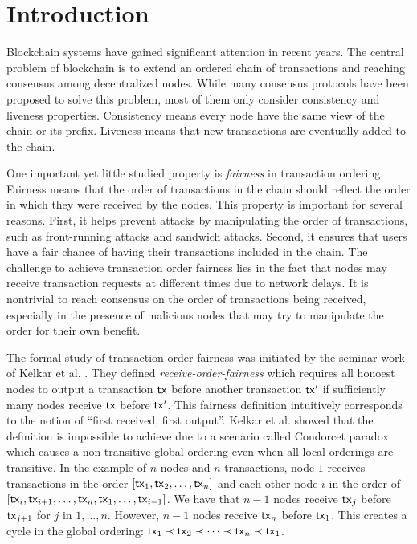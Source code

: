 
\section{Introduction}
Blockchain systems have gained significant attention in recent years. The central problem of blockchain is to extend an ordered chain of transactions and reaching consensus among decentralized nodes. While many consensus protocols have been proposed to solve this problem, most of them only consider consistency and liveness properties. Consistency means every node have the same view of the chain or its prefix. Liveness means that new transactions are eventually added to the chain. 

One important yet little studied property is \emph{fairness} in transaction ordering. Fairness means that the order of transactions in the chain should reflect the order in which they were received by the nodes. This property is important for several reasons. First, it helps prevent attacks by manipulating the order of transactions, such as front-running attacks and sandwich attacks. Second, it ensures that users have a fair chance of having their transactions included in the chain. The challenge to achieve transaction order fairness lies in the fact that nodes may receive transaction requests at different times due to network delays. It is nontrivial to reach consensus on the order of transactions being received, especially in the presence of malicious nodes that may try to manipulate the order for their own benefit. 

The formal study of transaction order fairness was initiated by the seminar work of Kelkar et al. \cite{DBLP:conf/crypto/Kelkar0GJ20}. They defined \textit{receive-order-fairness} which requires all honoest nodes to output a transaction $\mathsf{tx}$ before another transaction $\mathsf{tx}'$ if sufficiently many nodes receive $\mathsf{tx}$ before $\mathsf{tx}'$. This fairness definition intuitively corresponds to the notion of ``first received, first output''. Kelkar et al. showed that the definition is impossible to achieve due to a scenario called Condorcet paradox which causes a non-transitive global ordering even when all local orderings are transitive. In the example of $n$ nodes and $n$ transactions, node $1$ receives transactions in the order $[\mathsf{tx}_1, \mathsf{tx}_2,\dots, \mathsf{tx}_n]$ and each other node $i$ in the order of $[\mathsf{tx}_i, \mathsf{tx}_{i+1}, \dots, \mathsf{tx}_n, \mathsf{tx}_1, \dots, \mathsf{tx}_{i-1}]$. We have that $n-1$ nodes receive $\mathsf{tx}_j$ before $\mathsf{tx}_{j+1}$ for $j$ in $1,\dots, n$. However, $n-1$ nodes receive $\mathsf{tx}_n$ before $\mathsf{tx}_1$. This creates a cycle in the global ordering: $\mathsf{tx}_1 \prec \mathsf{tx}_2 \prec \dots \prec \mathsf{tx}_n \prec \mathsf{tx}_1$. 

